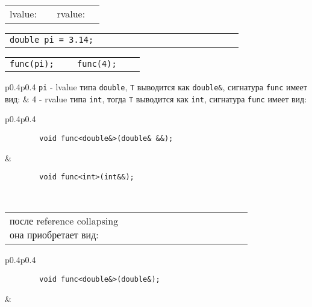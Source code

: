 \begin{center}
	\begin{tabular}{p{0.4\linewidth}p{0.4\linewidth}}
		lvalue: & rvalue:\\
	\end{tabular}
	
	\begin{tabular}{p{0.4\linewidth}p{0.4\linewidth}}
		\texttt{double pi = 3.14;}
		& \vspace{\baselineskip}\\
	\end{tabular}
	
	\begin{tabular}{p{0.4\linewidth}p{0.4\linewidth}}
		\texttt{func(pi);}
		&
		\texttt{func(4);}\\
	\end{tabular}
	
	\begin{tabular}{p{0.4\linewidth}p{0.4\linewidth}}
		\texttt{pi} - lvalue типа \texttt{double}, \texttt{T} выводится как \texttt{double&}, сигнатура \texttt{func} имеет вид:
		&
		4 - rvalue типа \texttt{int}, тогда \texttt{T} выводится как \texttt{int}, сигнатура \texttt{func} имеет вид: \\
	\end{tabular}
	
	\begin{tabular}{p{0.4\linewidth}p{0.4\linewidth}}
		\begin{verbatim}
		void func<double&>(double& &&);
		\end{verbatim}
		&
		\begin{verbatim}
		void func<int>(int&&);
		\end{verbatim} 
		\\
	\end{tabular}
	
	\begin{tabular}{p{0.4\linewidth}p{0.4\linewidth}}
		после reference collapsing она приобретает вид: & \vspace{\baselineskip} \\
	\end{tabular}
	
	\begin{tabular}{p{0.4\linewidth}p{0.4\linewidth}}
		\begin{verbatim}
		void func<double&>(double&);
		\end{verbatim}
		& \vspace{\baselineskip} \\
	\end{tabular}
	
\end{center}


